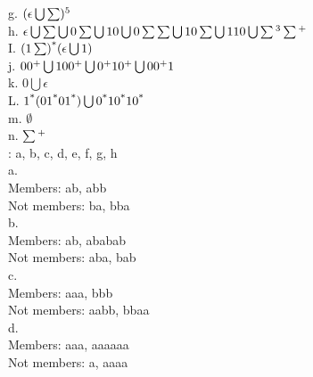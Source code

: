 \documentclass[12pt]{article}
\begin{document}
g. $(\epsilon\bigcup\sum)\textsuperscript{5}$ \\

h. $\epsilon \bigcup \sum \bigcup 0 \sum \bigcup 10 \bigcup 0 \sum\sum \bigcup 10\sum \bigcup 110 \bigcup \sum \textsuperscript{3} \sum \textsuperscript{+} $ \\

I. $(1 \sum) \textsuperscript{*}(\epsilon \bigcup 1) $ \\

j. $00 \textsuperscript{+} \bigcup 100 \textsuperscript{+} \bigcup 0 \textsuperscript{+}
    10 \textsuperscript{+} \bigcup 00 \textsuperscript{+} 1 $ \\

k. $ 0 \bigcup \epsilon $ \\

L. $ 1 \textsuperscript{*} (01\textsuperscript{*}01\textsuperscript{*}) \bigcup 0 
     \textsuperscript{*} 10 \textsuperscript{*} 10 \textsuperscript{*} $ \\

m. $ \emptyset $ \\

n. $ \sum \textsuperscript{+} $ \\


: a, b, c, d, e, f, g, h \\

\noindent
a. \\
Members: ab, abb \\
Not members: ba, bba \\

\noindent
b. \\
Members: ab, ababab \\
Not members: aba, bab \\

\noindent
c. \\
Members: aaa, bbb \\
Not members: aabb, bbaa \\

\noindent
d. \\
Members: aaa, aaaaaa  \\
Not members: a, aaaa
 \\
\end{document}
